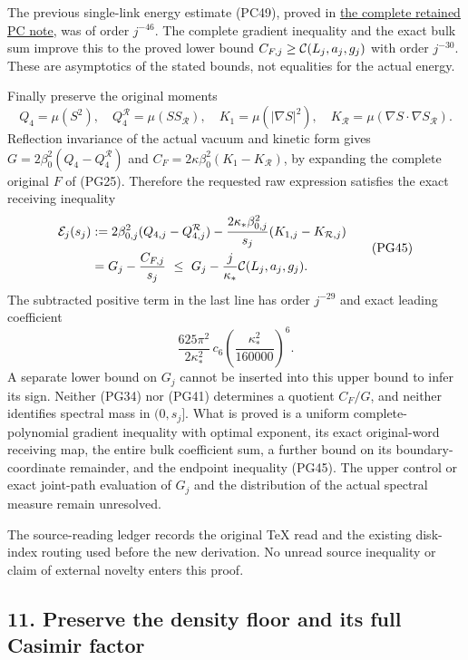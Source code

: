 \documentclass[11pt]{article}
\begin{document}
The previous single-link energy estimate (PC49), proved in
\href{https://github.com/KokunoYumeto/yang-mills-interacting-workbench/blob/main/yang-mills/continuations/20261011-central-signs-shrinking-window/POLYNOMIAL_CONDITIONAL_BOUNDS.md}{the complete retained PC note},
was of order \(j^{-46}\). The complete gradient inequality and
the exact bulk sum improve this to the proved lower bound
\(C_{F,j}\ge{\cal C}(L_j,a_j,g_j)\) with order \(j^{-30}\).
These are asymptotics of the stated bounds, not equalities for the
actual energy.

Finally preserve the original moments
\[
 Q_4=\mu(S^2),\quad Q_4^{\mathcal R}=\mu(SS_{\mathcal R}),\quad
 K_1=\mu(|\nabla S|^2),\quad
 K_{\mathcal R}=\mu(\nabla S\cdot\nabla S_{\mathcal R}).
 \tag{PG44}
\]
Reflection invariance of the actual vacuum and kinetic form gives
\(G=2\beta_0^2(Q_4-Q_4^{\mathcal R})\) and
\(C_F=2\kappa\beta_0^2(K_1-K_{\mathcal R})\), by expanding
the complete original \(F\) of (PG25). Therefore the requested
raw expression satisfies the exact receiving inequality
\[
 \begin{aligned}
 {\cal E}_j(s_j)
 &:=
 2\beta_{0,j}^2(Q_{4,j}-Q_{4,j}^{\mathcal R})
 -\frac{2\kappa_*\beta_{0,j}^2}{s_j}
                         (K_{1,j}-K_{\mathcal R,j})\\
 &=G_j-\frac{C_{F,j}}{s_j}
 \ \le\ G_j-\frac{j}{\kappa_*}{\cal C}(L_j,a_j,g_j).
 \end{aligned}\tag{PG45}
\]
The subtracted positive term in the last line has order \(j^{-29}\)
and exact leading coefficient
\[
 \frac{625\pi^2}{2\kappa_*^2}\,c_6
                 \left(\frac{\kappa_*^2}{160000}\right)^6.
 \tag{PG46}
\]
A separate lower bound on \(G_j\) cannot be inserted into this upper
bound to infer its sign. Neither (PG34) nor (PG41) determines a
quotient \(C_F/G\), and neither identifies spectral mass in
\((0,s_j]\). What is proved is a uniform complete-polynomial
gradient inequality with optimal exponent, its exact original-word
receiving map, the entire bulk coefficient sum, a further bound on
its boundary-coordinate remainder, and the endpoint inequality
(PG45). The upper control or exact joint-path evaluation of \(G_j\)
and the distribution of the actual spectral measure remain unresolved.

The source-reading ledger records the original TeX read and the
existing disk-index routing used before the new derivation. No
unread source inequality or claim of external novelty enters this proof.

\subsection*{11. Preserve the density floor and its full Casimir factor}
\end{document}
